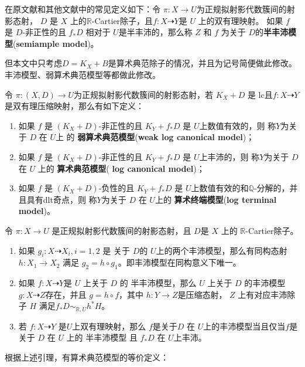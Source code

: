 \begin{remark}
  在原文献和其他文献中的常见定义如下：令 $ \pi:X\to U $为正规拟射影代数簇间的射影态射， $D$ 是 $X$ 上的$\mathbb{R}$-Cartier除子，且$ f: X\dashrightarrow Y $是 $U$ 上的双有理映射。  如果 $ f $ 是 $ D $-非正性的且 $ f_*D $ 相对于 $ U $是半丰沛的，那么称 $Z$ 和 $f$ 为关于 $D$的\textbf{半丰沛模型}(\textbf{semiample model})。

  但本文中只考虑$D=K_{X}+B$是算术典范除子的情况，并且为记号简便做此修改。丰沛模型、弱算术典范模型等都做此修改。
\end{remark}
\begin{definition}\label{models}
  \cite[Definition 3.6.7]{BCHM10} 令 $ \pi:(X,D)\to U $为正规拟射影代数簇间的射影态射，若 $ K_X+D $ 是 lc且$ f:X\dashrightarrow Y $是双有理压缩映射，那么有如下定义：
  \begin{enumerate}
    \item 如果 $f$ 是  $ (K_X+D) $-非正性的且 $ K_Y+f_*D $ 是 $ U $上数值有效的，则  称$ Y $为关于 $D$ 在 $U$上 的  \textbf{弱算术典范模型}(\textbf{weak log canonical model})；
    \item 如果 $f$ 是  $ (K_X+D) $-非正性的且 $ K_Y+f_*D $ 是 $ U $上丰沛的，则  称$ Y $为关于 $D$ 在 $U$ 上的  \textbf{算术典范模型}(\textbf{ log canonical model})；
    \item 如果 $f$ 是  $ (K_X+D) $-负性的且 $ K_Y+f_*D $ 是 $ U $上数值有效的和$\mathbb{Q}$-分解的，并且具有dlt奇点，则  称$ Y $为关于 $D$ 在 $U$上的  \textbf{算术终端模型}(\textbf{log terminal model})。
  \end{enumerate}
\end{definition}

\begin{lemma}\cite[lemma 3.6.6]{BCHM10}
  令 $\pi:X \to U$ 是正规拟射影代数簇间的射影态射，且 $D$是 $X$ 上的 $\mathbb{R}$-Cartier除子。

  \begin{enumerate}
    \item 如果 $g_{i}:X \dashrightarrow X_{i}, i=1,2$ 是 关于 $D$的  $U$上的两个丰沛模型，那么有同构态射 $h:X_{1}\to X_{2}$ 满足 $g_{2}=h \circ g_{1}$。即丰沛模型在同构意义下唯一。
    \item 如果 $f:X \dashrightarrow Y$是 $U$ 上关于 $D$ 的 半丰沛模型，那么 $U$ 上关于 $D$ 的丰沛模型 $g:X \dashrightarrow  Z$存在，并且 $g=h \circ f$，其中 $h:Y \to Z$是压缩态射， $Z$ 上有对应丰沛除子 $H$  满足$f_*D \sim_{\mathbb{R},U}h^*H$。
    \item  若 $f:X \dashrightarrow Y$  是$U$上双有理映射，那么 $f$是关于$D$ 在 $U$上的丰沛模型当且仅当$f$是关于 $D$ 在 $U$ 上的  半丰沛模型 且 $f_*D$ 在 $U$上丰沛。
  \end{enumerate}
\end{lemma}
根据上述引理，有算术典范模型的等价定义：

